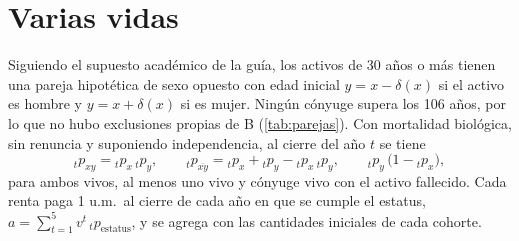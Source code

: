 \documentclass[10pt,a4paper]{article}
\numberwithin{equation}{section}
\newcommand{\tabla}[1]{}
\newcommand{\um}{u.m.}
\begin{document}
	\begin{table}[htbp]
		\centering\small
		\setlength{\tabcolsep}{5pt}
		\tabla{A_poblacion_anual}
		\caption{Proyección anual de la cartera por causa (personas esperadas). Las columnas acumuladas corresponden a los estados absorbentes Fallecido y Renuncia.}\label{tab:poblacion}
	\end{table}

	\begin{table}[htbp]
		\centering\small
		\tabla{A_controles}
		\caption{Controles de la proyección: diferencias absolutas máximas entre cantidades que deben coincidir.}\label{tab:controles}
	\end{table}

	\section{Varias vidas}\label{sec:B}

	Siguiendo el supuesto académico de la guía, los activos de 30 años o más tienen una pareja hipotética de sexo opuesto con edad inicial \(y=x-\delta(x)\) si el activo es hombre y \(y=x+\delta(x)\) si es mujer. Ningún cónyuge supera los 106 años, por lo que no hubo exclusiones propias de B (\cref{tab:parejas}). Con mortalidad biológica, sin renuncia y suponiendo independencia, al cierre del año \(t\) se tiene~\cite{Dickson2020}
	\begin{equation}\label{eq:estatus}
		{}_tp_{xy}={}_tp_x\,{}_tp_y,\qquad {}_tp_{\overline{xy}}={}_tp_x+{}_tp_y-{}_tp_x\,{}_tp_y,\qquad {}_tp_y\,\bigl(1-{}_tp_x\bigr),
	\end{equation}
	para ambos vivos, al menos uno vivo y cónyuge vivo con el activo fallecido. Cada renta paga 1 \um\ al cierre de cada año en que se cumple el estatus, \(a=\sum_{t=1}^{5}v^t\,{}_tp_{\text{estatus}}\), y se agrega con las cantidades iniciales de cada cohorte.

	\begin{table}[htbp]
		\centering\small
		\tabla{B_parejas}
		\caption{Activos con y sin pareja admisible en B.}\label{tab:parejas}
	\end{table}

	\begin{table}[htbp]
		\centering\small
		\tabla{B_valores_presentes}
		\caption{Valores presentes agregados de las tres rentas, en \um\ por unidad de renta. Son coberturas alternativas y no se suman entre sí.}\label{tab:vpB}
	\end{table}
\end{document}

